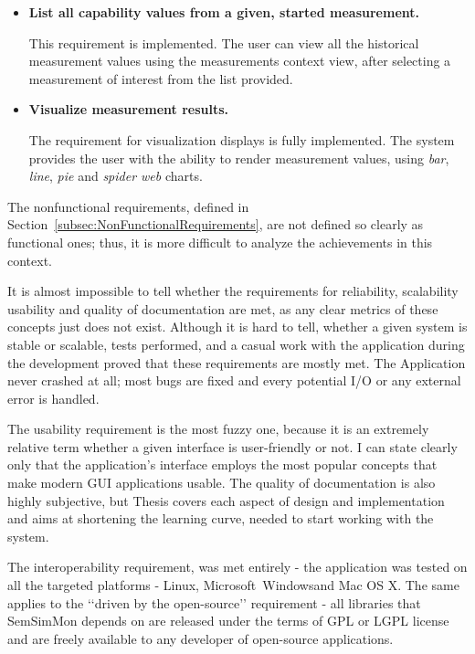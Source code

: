 \begin{itemize}
\item {\bf List all capability values from a given, started measurement.}

This requirement is implemented. The user can view all the historical measurement values using the measurements context view, after selecting a measurement of interest from the list provided.

\item {\bf Visualize measurement results.}

The requirement for visualization displays is fully implemented. The system provides the user with the ability to render measurement values, using \emph{bar}, \emph{line}, \emph{pie} and \emph{spider web} charts.

\end{itemize}

The nonfunctional requirements, defined in Section~\ref{subsec:NonFunctionalRequirements}, are not defined so clearly as functional ones; thus, it is more difficult to analyze the achievements in this context.

It is almost impossible to tell whether the requirements for reliability, scalability usability and quality of documentation are met, as any clear metrics of these concepts just does not exist. Although it is hard to tell, whether a given system is stable or scalable, tests performed, and a casual work with the application during the development proved that these requirements are mostly met. The Application never crashed at all; most bugs are fixed and every potential I/O or any external error is handled.

The usability requirement is the most fuzzy one, because it is an extremely relative term whether a given interface is user-friendly or not. I can state clearly only that the application\rq{}s interface employs the most popular concepts that make modern GUI applications usable. The quality of documentation is also highly subjective, but Thesis covers each aspect of design and implementation and aims at shortening the learning curve, needed to start working with the system.

The interoperability requirement, was met entirely - the application was tested on all the targeted platforms - Linux, Microsoft\textregistered~Windows\textregistered and Mac OS X\textregistered. The same applies to the \lq\lq{}driven by the open-source\rq\rq{} requirement - all libraries that SemSimMon depends on are released under the terms of GPL or LGPL license and are freely available to any developer of open-source applications.
